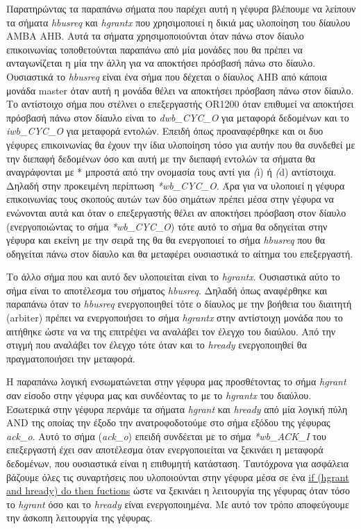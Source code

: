 \documentclass[a4paper,10pt]{article}
\numberwithin{figure}{section}
\numberwithin{table}{section}
\begin{document}
\newpage
Παρατηρώντας τα παραπάνω σήματα που παρέχει αυτή η γέφυρα βλέπουμε να λείπουν τα σήματα \emph{hbusreq} και \emph{hgrantx} που χρησιμοποιεί η δικιά μας υλοποίηση του δίαυλου AMBA AHB. Αυτά τα σήματα χρησιμοποιούνται όταν πάνω στον δίαυλο επικοινωνίας τοποθετούνται παραπάνω από μία μονάδες που θα πρέπει να ανταγωνίζεται η μία την άλλη για να αποκτήσει πρόσβασή πάνω στο δίαυλο. Ουσιαστικά το \emph{hbusreq} είναι ένα σήμα που δέχεται ο δίαυλος AHB από κάποια μονάδα master όταν αυτή η μονάδα θέλει να αποκτήσει πρόσβαση πάνω στον δίαυλο. Το αντίστοιχο σήμα που στέλνει ο επεξεργαστής OR1200 όταν επιθυμεί να αποκτήσει πρόσβασή πάνω στον δίαυλο είναι το \emph{dwb\_CYC\_O} για μεταφορά δεδομένων και το \emph{iwb\_CYC\_O} για μεταφορά εντολών. Επειδή όπως προαναφέρθηκε και οι δυο γέφυρες επικοινωνίας θα έχουν την ίδια υλοποίηση τόσο για αυτήν που θα συνδεθεί με την διεπαφή δεδομένων όσο και αυτή με την διεπαφή εντολών τα σήματα θα αναγράφονται με * μπροστά από την ονομασία τους αντί για \emph(i) ή \emph(d) αντίστοιχα. Δηλαδή στην προκειμένη περίπτωση \emph{*wb\_CYC\_O}. Άρα για να υλοποιεί η γέφυρα επικοινωνίας τους σκοπούς αυτών των δύο σημάτων πρέπει μέσα στην γέφυρα να ενώνονται αυτά και όταν ο επεξεργαστής θέλει αν αποκτήσει πρόσβαση στον δίαυλο (ενεργοποιώντας το σήμα \emph{*wb\_CYC\_O}) τότε αυτό το σήμα θα οδηγείται στην γέφυρα και εκείνη με την σειρά της θα  θα ενεργοποιεί το σήμα \emph{hbusreq} που θα οδηγείται πάνω στον δίαυλο και θα μεταφέρει ουσιαστικά το αίτημα του επεξεργαστή.


Το άλλο σήμα που και αυτό δεν υλοποιείται  είναι το \emph{hgrantx}. Ουσιαστικά αύτο το σήμα είναι το αποτέλεσμα του σήματος \emph{hbusreq}. Δηλαδή όπως αναφέρθηκε και παραπάνω όταν το \emph{hbusreq} ενεργοποιηθεί τότε ο δίαυλος με την βοήθεια του διαιτητή (arbiter) πρέπει να ενεργοποιήσει το σήμα \emph{hgrantx} στην αντίστοιχη μονάδα που το αιτήθηκε ώστε να να της επιτρέψει να αναλάβει τον έλεγχο του διαύλου. Από την στιγμή που αναλάβει τον έλεγχο τότε όταν και το \emph{hready} ενεργοποιηθεί θα πραγματοποιήσει την μεταφορά.

Η παραπάνω λογική ενσωματώνεται στην γέφυρα μας προσθέτοντας το σήμα \emph{hgrant} σαν είσοδο στην γέφυρα μας και συνδέοντας το με το \emph{hgrantx} του διαύλου. Εσωτερικά στην γέφυρα περνάμε τα σήματα \emph{hgrant} και \emph{hready} από μία λογική πύλη AND της οποίας την έξοδο την ανατροφοδοτούμε στο σήμα εξόδου της γέφυρας \emph{ack\_o}. Αυτό το σήμα (\emph{ack\_o}) επειδή συνδέεται με το σήμα \emph{*wb\_ACK\_I} του επεξεργαστή έχει σαν αποτέλεσμα όταν ενεργοποιείται να ξεκινάει η μεταφορά δεδομένων, που ουσιαστικά είναι η επιθυμητή κατάσταση. Ταυτόχρονα για ασφάλεια βάζουμε όλες τις συναρτήσεις που υλοποιούνται στην γέφυρα μέσα σε ένα \underline{if (hgrant and hready) do then fuctions} ώστε να ξεκινάει η λειτουργία της γέφυρας όταν τόσο το \emph{hgrant} όσο και το \emph{hready} είναι ενεργοποιημένα. Με αυτό τον τρόπο αποφεύγουμε την άσκοπη λειτουργία της γέφυρας.
\end{document}
